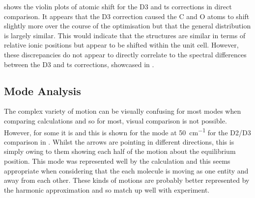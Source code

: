  shows the violin plots of atomic shift for the D3 and \acrshort{ts} corrections in direct comparison. It appears that the D3 correction caused the C and O atoms to shift slightly more over the course of the optimisation but that the general distribution is largely similar. This would indicate that the structures are similar in terms of relative ionic positions but appear to be shifted within the unit cell. However, these discrepancies do not appear to directly correlate to the spectral differences between the D3 and \acrshort{ts} corrections, showcased in .

\subsection{Mode Analysis}
\label{subsec:ivdw_modeanal}
The complex variety of motion can be visually confusing for most modes when comparing calculations and so for most, visual comparison is not possible. However, for some it is and this is shown for the mode at \SI{50}{cm^{-1}} for the D2/D3 comparison in . Whilst the arrows are pointing in different directions, this is simply owing to them showing each half of the motion about the equilibrium position. This mode was represented well by the calculation and this seems appropriate when considering that the each molecule is moving as one entity and away from each other. These kinds of motions are probably better represented by the harmonic approximation and so match up well with experiment.


